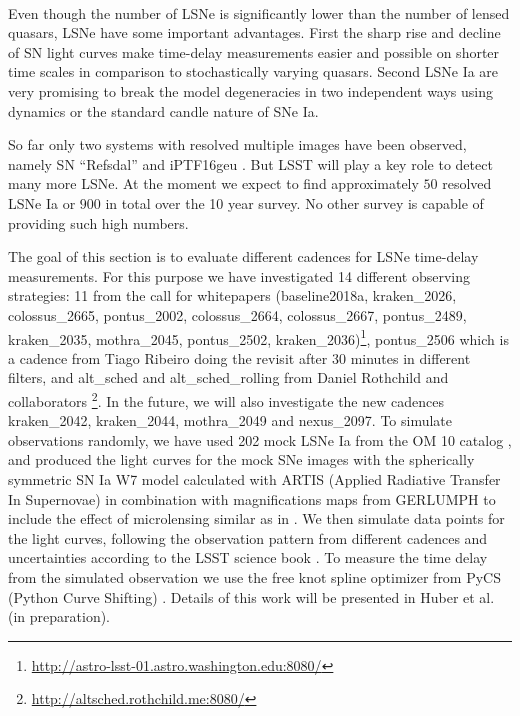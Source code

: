 \

Even though the number of LSNe is significantly lower than the number of
lensed quasars, LSNe have some important advantages. First 
the sharp rise
and decline of SN light curves make time-delay measurements easier and possible
on shorter time scales in comparison to stochastically varying quasars. Second LSNe Ia are very promising
to break the model degeneracies \citep{Schneider:2013wga} in two
independent ways using dynamics \citep{Barnabe2011,2017:Yildirim} or
the standard candle nature of SNe Ia.  

So far only two systems with resolved
multiple images have been observed, namely SN ``Refsdal''
\citep{Kelly:2015xvu,Kelly:2015vjq} and iPTF16geu
\citep{Goobar:2016uuf}. But LSST will play a key role to detect many
more LSNe. At the moment we expect to find approximately $50$ resolved
LSNe Ia \citep{Oguri:2010} or $900$ in total \citep{Goldstein:2017bny}
over the 10 year survey. No other survey is capable of providing such
high numbers.

The goal of this section is to evaluate different
cadences for LSNe time-delay measurements. For this purpose we have investigated
14 different observing strategies: 11 from the call for whitepapers
(baseline2018a, kraken\_2026, colossus\_2665, pontus\_2002,
colossus\_2664, colossus\_2667, pontus\_2489, kraken\_2035,
mothra\_2045, pontus\_2502,
kraken\_2036)\footnote{\url{http://astro-lsst-01.astro.washington.edu:8080/}},
pontus\_2506 which is a cadence from Tiago Ribeiro doing the revisit
after 30 minutes in different filters, and alt\_sched and
alt\_sched\_rolling from Daniel Rothchild and collaborators
\footnote{\url{http://altsched.rothchild.me:8080/}}. In the future, we
will also investigate the new cadences kraken\_2042, kraken\_2044,
mothra\_2049 and nexus\_2097. To simulate observations randomly, we have used 202
mock LSNe Ia from the OM 10 catalog \citep{Oguri:2010},
and produced the light curves for the mock SNe images with
the spherically symmetric SN Ia W7 model \citep{1984:Nomoto}
calculated with ARTIS (Applied Radiative Transfer In Supernovae)
\citep{Kromer:2009ce} in combination with magnifications maps from
GERLUMPH \citep{Vernardos:2015wta} to include the effect of
microlensing similar as in \citep{Goldstein:2017bny}. We then simulate
data points for the light curves, following the observation pattern from different cadences
and uncertainties according to the LSST science book
\citep{2009:LSSTscience}. To measure the time delay from the simulated
observation we use the free knot spline optimizer from PyCS (Python
Curve Shifting) \citep{2013:Tewesb,Bonvin:2015jia}. Details of this
work will be presented in Huber et al. (in preparation).


